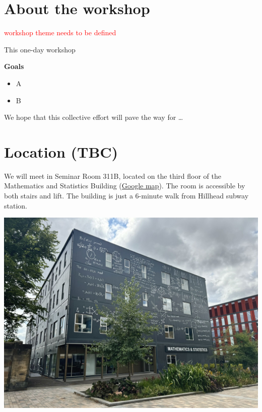 \documentclass[
  11pt,
  letterpaper,
  DIV=11,
  numbers=noendperiod]{scrartcl}
\renewcommand*\contentsname{Table of contents}
\newcommand\contentsname{Table of contents}
\begin{document}
\ifdefined\Shaded\renewenvironment{Shaded}{\begin{tcolorbox}[boxrule=0pt, enhanced, borderline west={3pt}{0pt}{shadecolor}, interior hidden, sharp corners, frame hidden, breakable]}{\end{tcolorbox}}\fi

\renewcommand*\contentsname{Table of contents}
{
\hypersetup{linkcolor=}
\setcounter{tocdepth}{3}
\tableofcontents
}
\newcommand{\red}[1]{\textcolor{red}{#1}}

\newpage

\hypertarget{about-the-workshop}{%
\section{About the workshop}\label{about-the-workshop}}

\textcolor{red}{workshop theme needs to be defined}

This one-day workshop

\textbf{Goals}

\begin{itemize}
\item
  A
\item
  B
\end{itemize}

We hope that this collective effort will pave the way for \ldots{}

\newpage

\hypertarget{location-tbc}{%
\section{Location (TBC)}\label{location-tbc}}

We will meet in Seminar Room 311B, located on the third floor of the
Mathematics and Statistics Building
(\href{https://www.google.com/maps/place/School+of+Mathematics+and+Statistics/@55.8726073,-4.2944843,871m/data=!3m2!1e3!4b1!4m6!3m5!1s0x488845cfd066d839:0xeab86bed8f92f0d0!8m2!3d55.8726073!4d-4.2944843!16s\%2Fg\%2F11ddzkn8v0?entry=ttu\&g_ep=EgoyMDI1MDYwMS4wIKXMDSoASAFQAw\%3D\%3D}{Google
map}). The room is accessible by both stairs and lift. The building is
just a 6-minute walk from Hillhead subway station.

\begin{center}
\includegraphics[width=0.6\linewidth]{ms-building.jpg}
\end{center}
\end{document}
